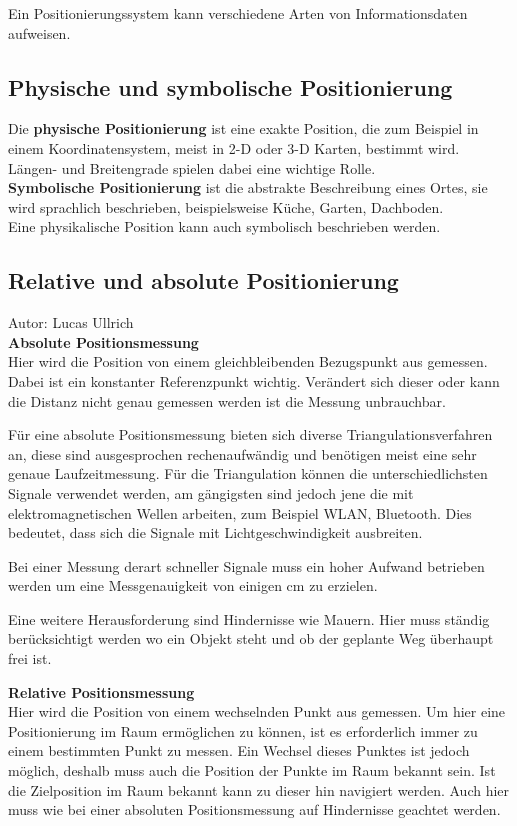     Ein Positionierungssystem kann verschiedene Arten von Informationsdaten\cite{pos_eigenschaften} aufweisen. 

    \subsection*{Physische und symbolische Positionierung}
    Die \textbf{physische Positionierung} ist eine exakte Position, die zum Beispiel in einem Koordinatensystem, meist in 2-D oder 3-D Karten, bestimmt wird. Längen- und Breitengrade spielen dabei eine wichtige Rolle.\\
    \textbf{Symbolische Positionierung} ist die abstrakte Beschreibung eines Ortes, sie wird sprachlich beschrieben, beispielsweise Küche, Garten, Dachboden.\\
    Eine physikalische Position kann auch symbolisch beschrieben werden.

    \subsection*{Relative und absolute Positionierung}
    Autor: Lucas Ullrich\\

    \textbf{Absolute Positionsmessung}\\
    Hier wird die Position von einem gleichbleibenden Bezugspunkt aus gemessen. Dabei ist ein konstanter Referenzpunkt wichtig.
    Verändert sich dieser oder kann die Distanz nicht genau gemessen werden ist die Messung unbrauchbar.

    Für eine absolute Positionsmessung bieten sich diverse Triangulationsverfahren an, diese sind ausgesprochen rechenaufwändig und benötigen meist eine sehr genaue Laufzeitmessung.
    Für die Triangulation können die unterschiedlichsten Signale verwendet werden, am gängigsten sind jedoch jene die mit elektromagnetischen Wellen arbeiten,
    zum Beispiel WLAN, Bluetooth. Dies bedeutet, dass sich die Signale mit Lichtgeschwindigkeit ausbreiten.

    Bei einer Messung derart schneller Signale muss ein hoher Aufwand betrieben werden um eine Messgenauigkeit von einigen cm zu erzielen.

    Eine weitere Herausforderung sind Hindernisse wie Mauern. Hier muss ständig berücksichtigt werden wo ein Objekt steht und ob der geplante Weg überhaupt frei ist.

    \textbf{Relative Positionsmessung}\\
    Hier wird die Position von einem wechselnden Punkt aus gemessen. Um hier eine Positionierung im Raum ermöglichen zu können,
    ist es erforderlich immer zu einem bestimmten Punkt zu messen. Ein Wechsel dieses Punktes ist jedoch möglich,
    deshalb muss auch die Position der Punkte im Raum bekannt sein. Ist die Zielposition im Raum bekannt kann zu dieser hin navigiert werden.
    Auch hier muss wie bei einer absoluten Positionsmessung auf Hindernisse geachtet werden.

